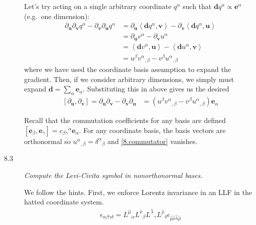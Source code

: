 \documentclass[12pt]{report}
\newcommand{\bm}[1]{\boldsymbol{\mathbf{#1}}}
\newcommand{\expvalue}[1]{\left<#1\right>}
\begin{document}
\begin{description}
        Let's try acting on a single arbitrary coordinate $q^\alpha$ such that
        $\bm{d}q^\alpha \propto \bm{e}^\alpha$ (e.g.\ one dimension):
        \begin{align*}
            \partial_{\bm{u}}\partial_{\bm{v}}q^\alpha -
                \partial_{\bm{v}}\partial_{\bm{u}}q^\alpha &=
            \partial_{\bm{u}}\expvalue{\bm{d}q^\alpha, \bm{v}} -
                \partial_{\bm{v}}\expvalue{\bm{d}q^\alpha, \bm{u}}\\
            &= \partial_{\bm{u}}v^\alpha -
                \partial_{\bm{v}}u^\alpha\\
            &= \expvalue{\bm{d}v^\alpha, \bm{u}} -
                \expvalue{\bm{d}u^\alpha, \bm{v}}\\
            &= u^\beta {v^\alpha}_{,\beta} -
                v^\beta {u^\alpha}_{,\beta}
        \end{align*}
        where we have used the coordinate basis assumption to expand the
        gradient. Then, if we consider arbitrary dimensions, we simply must expand
        $\bm{d} = \sum_\alpha \bm{e}_\alpha$. Substituting this in above gives
        us the desired
        \begin{align}
            \left[ \partial_{\bm{u}}, \partial_{\bm{v}} \right]
            = \partial_{\bm{u}}\partial_{\bm{v}} -
                \partial_{\bm{v}}\partial_{\bm{u}}
            &= \left(u^\beta {v^\alpha}_{,\beta} -
                v^\beta {u^\alpha}_{,\beta}\right)\bm{e}_\alpha
                \label{8.commutator}
        \end{align}

        Recall that the commutation coefficients for any basis are defined
        $\left[ \bm{e}_\beta, \bm{e}_\gamma \right] =
        {c_{\beta\gamma}}^\alpha \bm{e}_\alpha$. For any coordinate basis, the
        basis vectors are orthonormal so ${u^\alpha}_{,\beta} =
        {\delta^\alpha}_\beta$ and \autoref{8.commutator} vanishes.

    \item[8.3] \emph{Compute the Levi-Civita symbol in nonorthonormal bases.}

        We follow the hints. First, we enforce Lorentz invariance in an LLF in
        the hatted coordinate system.
        \begin{align*}
            \epsilon_{\alpha\beta\gamma\delta} =
                {L^{\hat{\mu}}}_\alpha
                {L^{\hat{\nu}}}_\beta
                {L^{\hat{\lambda}}}_\gamma
                {L^{\hat{\rho}}}_\delta
                \epsilon_{\hat{\mu}\hat{\nu}\hat{\lambda}\hat{\rho}}
        \end{align*}


\end{description}
\end{document}
